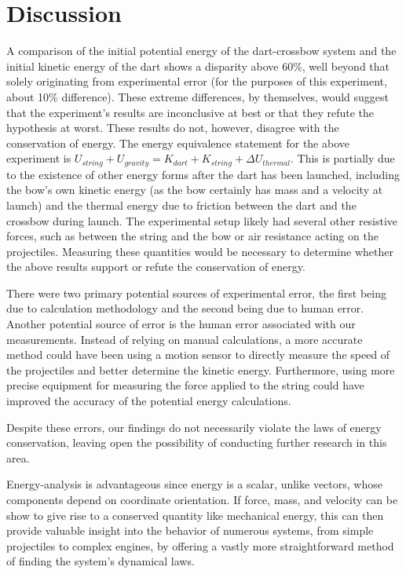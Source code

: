 \documentclass[reprint,amsmath,amssymb,aps,twoside]{revtex4-2}
\begin{document}
\section{Discussion}
A comparison of the initial potential energy of the dart-crossbow system and the initial kinetic energy of the dart shows a disparity above 60\%, well beyond that solely originating from experimental error (for the purposes of this experiment, about 10\% difference). These extreme differences, by themselves, would suggest that the experiment’s results are inconclusive at best or that they refute the hypothesis at worst. These results do not, however, disagree with the conservation of energy. The energy equivalence statement for the above experiment is $U_{string} + U_{gravity} = K_{dart} + K_{string} + \Delta U_{thermal}$. This is partially due to the existence of other energy forms after the dart has been launched, including the bow’s own kinetic energy (as the bow certainly has mass and a velocity at launch) and the thermal energy due to friction between the dart and the crossbow during launch. The experimental setup likely had several other resistive forces, such as between the string and the bow or air resistance acting on the projectiles. Measuring these quantities would be necessary to determine whether the above results support or refute the conservation of energy.

There were two primary potential sources of experimental error, the first being due to calculation methodology and the second being due to human error. Another potential source of error is the human error associated with our measurements. Instead of relying on manual calculations, a more accurate method could have been using a motion sensor to directly measure the speed of the projectiles and better determine the kinetic energy. Furthermore, using more precise equipment for measuring the force applied to the string could have improved the accuracy of the potential energy calculations.

Despite these errors, our findings do not necessarily violate the laws of energy conservation, leaving open the possibility of conducting further research in this area.

Energy-analysis is advantageous since energy is a scalar, unlike vectors, whose components depend on coordinate orientation. If force, mass, and velocity can be show to give rise to a conserved quantity like mechanical energy, this can then provide valuable insight into the behavior of numerous systems, from simple projectiles to complex engines, by offering a vastly more straightforward method of finding the system's dynamical laws.
\end{document}
